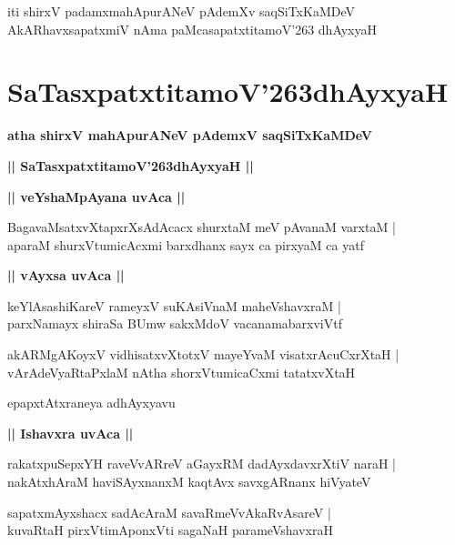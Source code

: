 \documentclass[twoside,12pt,openright]{book}
\def\S{\char'263}
\newcounter{shloka}[chapter]
\def\uvaca#1{\centerline{{\large\textbf{#1}}}}
\begin{document}
\begin{center}
iti shirxV padamxmahApurANeV pAdemXv saqSiTxKaMDeV AkARhavxsapatxmiV nAma paMcasapatxtitamoV\S 
dhAyxyaH
\end{center}

\chapter{SaTasxpatxtitamoV\S dhAyxyaH}

\begin{center}
{\LARGE\bfseries atha shirxV mahApurANeV pAdemxV saqSiTxKaMDeV}
\end{center}

\begin{center}
{\LARGE\bfseries || SaTasxpatxtitamoV\S dhAyxyaH || }
\end{center}

\uvaca{|| veYshaMpAyana uvAca ||}

\begin{shloka}%
BagavaMsatxvXtapxrXsAdAcacx shurxtaM meV pAvanaM varxtaM |\\
aparaM shurxVtumicAcxmi barxdhanx sayx ca pirxyaM ca yatf 
\end{shloka}

\uvaca {|| vAyxsa uvAca ||}

\begin{shloka}%
keYlAsashiKareV rameyxV suKAsiVnaM maheVshavxraM |\\
parxNamayx shiraSa BUmw sakxMdoV vacanamabarxviVtf 
\end{shloka}

\begin{shloka}%
akARMgAKoyxV vidhisatxvXtotxV mayeYvaM visatxrAcuCxrXtaH |\\
vArAdeVyaRtaPxlaM nAtha shorxVtumicaCxmi tatatxvXtaH 
\end{shloka}

\begin{center}
epapxtAtxraneya adhAyxyavu
\end{center}

\uvaca{|| Ishavxra uvAca ||}

\begin{shloka}%
rakatxpuSepxYH raveVvARreV aGayxRM dadAyxdavxrXtiV naraH |\\
nakAtxhAraM haviSAyxnanxM kaqtAvx savxgARnanx hiVyateV 
\end{shloka}

\begin{shloka}%
sapatxmAyxshacx sadAcAraM savaRmeVvAkaRvAsareV |\\
kuvaRtaH pirxVtimAponxVti sagaNaH parameVshavxraH 
\end{shloka}
\end{document}
